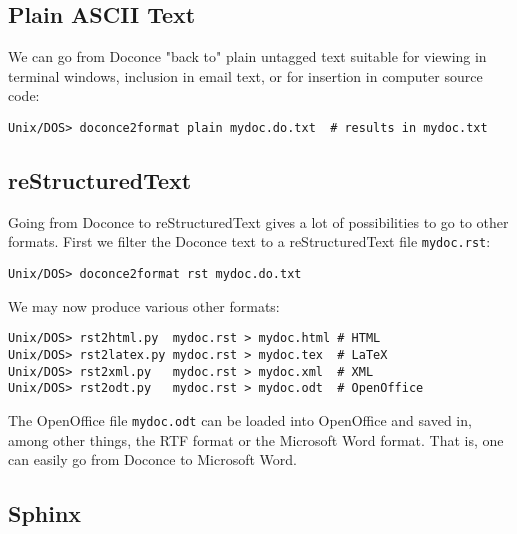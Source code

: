 \documentclass{article}
\begin{document}
\subsection{Plain ASCII Text}

We can go from Doconce "back to" plain untagged text suitable for viewing
in terminal windows, inclusion in email text, or for insertion in
computer source code:
\vspace{4pt}
\begin{Verbatim}[numbers=none,frame=lines,label=\fbox{{\tiny Terminal}},fontsize=\fontsize{9pt}{9pt},
labelposition=topline,framesep=2.5mm,framerule=0.7pt]
Unix/DOS> doconce2format plain mydoc.do.txt  # results in mydoc.txt
\end{Verbatim}

\subsection{reStructuredText}

Going from Doconce to reStructuredText gives a lot of possibilities to
go to other formats. First we filter the Doconce text to a
reStructuredText file {\fontsize{10pt}{10pt}\verb!mydoc.rst!}:
\vspace{4pt}
\begin{Verbatim}[numbers=none,frame=lines,label=\fbox{{\tiny Terminal}},fontsize=\fontsize{9pt}{9pt},
labelposition=topline,framesep=2.5mm,framerule=0.7pt]
Unix/DOS> doconce2format rst mydoc.do.txt
\end{Verbatim}
We may now produce various other formats:
\vspace{4pt}
\begin{Verbatim}[numbers=none,frame=lines,label=\fbox{{\tiny Terminal}},fontsize=\fontsize{9pt}{9pt},
labelposition=topline,framesep=2.5mm,framerule=0.7pt]
Unix/DOS> rst2html.py  mydoc.rst > mydoc.html # HTML
Unix/DOS> rst2latex.py mydoc.rst > mydoc.tex  # LaTeX
Unix/DOS> rst2xml.py   mydoc.rst > mydoc.xml  # XML
Unix/DOS> rst2odt.py   mydoc.rst > mydoc.odt  # OpenOffice
\end{Verbatim}
The OpenOffice file {\fontsize{10pt}{10pt}\verb!mydoc.odt!} can be loaded into OpenOffice and
saved in, among other things, the RTF format or the Microsoft Word format.
That is, one can easily go from Doconce to Microsoft Word.

\subsection{Sphinx}
\end{document}
